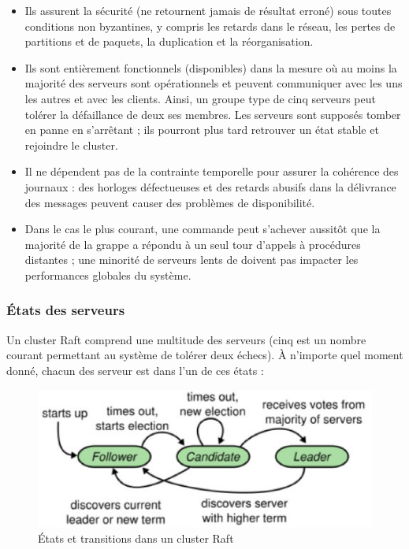 \begin{itemize}
    \item Ils assurent la sécurité (ne retournent jamais de résultat erroné)
        sous toutes conditions non byzantines, y compris les retards dans le
        réseau, les pertes de partitions et de paquets, la duplication et
        la réorganisation.
    \item Ils sont entièrement fonctionnels (disponibles) dans la mesure où au
        moins la majorité des serveurs sont opérationnels et peuvent communiquer
        avec les uns les autres et avec les clients. Ainsi, un groupe type de
        cinq serveurs peut tolérer la défaillance de deux ses membres. Les
        serveurs sont supposés tomber en panne en s'arrêtant ; ils pourront plus
        tard retrouver un état stable et rejoindre le cluster.
    \item Il ne dépendent pas de la contrainte temporelle pour assurer la
        cohérence des journaux : des horloges défectueuses et des retards
        abusifs dans la délivrance des messages peuvent causer des problèmes de
        disponibilité. 
    \item Dans le cas le plus courant, une commande peut s'achever aussitôt que
        la majorité de la grappe a répondu à un seul tour d'appels à procédures
        distantes ; une minorité de serveurs lents de doivent pas impacter les
        performances globales du système.
\end{itemize}

\subsubsection{États des serveurs}

Un cluster Raft comprend une multitude des serveurs (cinq est un nombre courant
permettant au système de tolérer deux échecs). À n'importe quel moment donné,
chacun des serveur est dans l'un de ces états :

\begin{figure}
    \centerline{\includegraphics[width=.47\textwidth]{img/raft_server_states}}
    \caption{États et transitions dans un cluster Raft}
    \label{raft_server_states}
\end{figure}

